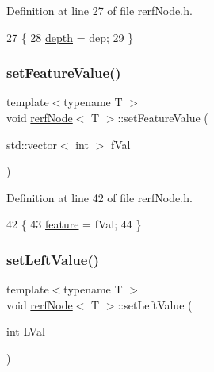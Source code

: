 Definition at line 27 of file rerf\+Node.\+h.


\begin{DoxyCode}
27                                      \{
28             \hyperlink{classrerfNode_a85845e08b7db33d241ddc3ff6b63799f}{depth} = dep;
29         \}
\end{DoxyCode}
\mbox{\label{classrerfNode_aa3253da3948adeffa9a908caa339f396}} 
\subsubsection{\texorpdfstring{set\+Feature\+Value()}{setFeatureValue()}}
{\footnotesize\ttfamily template$<$typename T $>$ \\
void \hyperlink{classrerfNode}{rerf\+Node}$<$ T $>$\+::set\+Feature\+Value (\begin{DoxyParamCaption}\item[{std\+::vector$<$ int $>$}]{f\+Val }\end{DoxyParamCaption})\hspace{0.3cm}{\ttfamily [inline]}}



Definition at line 42 of file rerf\+Node.\+h.


\begin{DoxyCode}
42                                                         \{
43             \hyperlink{classrerfNode_af41edc70aae781312c3b20311430a89a}{feature} = fVal;
44         \}
\end{DoxyCode}
\mbox{\label{classrerfNode_a1de908ea051d4845ca00296d42c7ae80}} 
\subsubsection{\texorpdfstring{set\+Left\+Value()}{setLeftValue()}}
{\footnotesize\ttfamily template$<$typename T $>$ \\
void \hyperlink{classrerfNode}{rerf\+Node}$<$ T $>$\+::set\+Left\+Value (\begin{DoxyParamCaption}\item[{int}]{L\+Val }\end{DoxyParamCaption})\hspace{0.3cm}{\ttfamily [inline]}}



